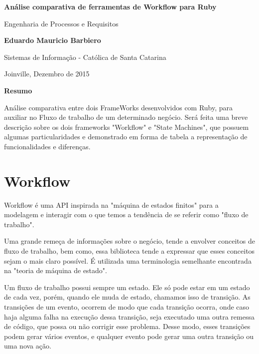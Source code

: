 \documentclass[12pt, letterpaper]{article}
\begin{document}
\begin{center}
    \Large
    \textbf{Análise comparativa de ferramentas de Workflow para Ruby}
    
    \vspace{0.4cm}
    \large
    Engenharia de Processos e Requisitos
    
    \vspace{0.4cm}
    \textbf{Eduardo Mauricio Barbiero}
    
    \vspace{0.4cm}
    \large
    Sistemas de Informação - Católica de Santa Catarina
    
    \vspace{0.4cm}
    {Joinville, Dezembro de 2015}
    
    \vspace{0.9cm}
    \textbf{Resumo}
\end{center}

\par
Análise comparativa entre dois FrameWorks desenvolvidos com Ruby, para auxiliar no Fluxo de trabalho de um determinado negócio. Será feita uma breve descrição sobre os dois frameworks "Workflow" e "State Machines", que possuem algumas particularidades e demonstrado em forma de tabela a representação de funcionalidades e diferenças. 

\section{Workflow}

Workflow é uma API inspirada na "máquina de estados finitos" para a modelagem e interagir com o que temos a tendência de se referir como "fluxo de trabalho".

Uma grande remeça de informações sobre o negócio, tende a envolver conceitos de fluxo de trabalho, bem como, essa biblioteca tende a expressar que esses conceitos sejam o mais claro possível. É utilizada uma terminologia semelhante encontrada na "teoria de máquina de estado".

Um fluxo de trabalho possui sempre um estado. Ele só pode estar em um estado de cada vez, porém, quando ele muda de estado, chamamos isso de transição. As transições de um evento, ocorrem de modo que cada transição ocorra, onde caso haja alguma falha na execução dessa transição, seja executado uma outra remessa de código, que possa ou não corrigir esse problema. Desse modo, esses transições podem gerar vários eventos, e qualquer evento pode gerar uma outra transição ou uma nova ação.
\end{document}

